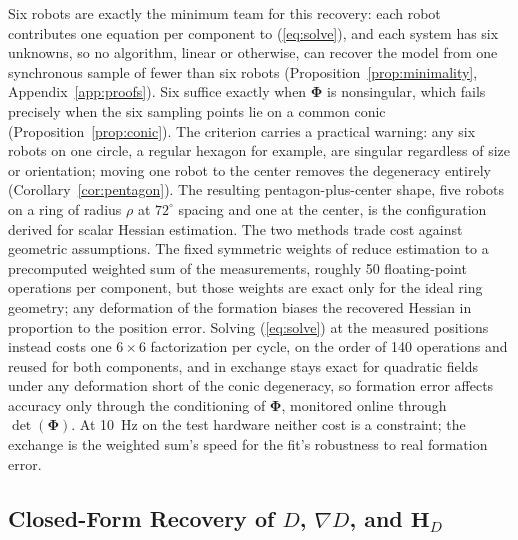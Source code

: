 \documentclass[lettersize,journal]{IEEEtran}
\begin{document}
Six robots are exactly the minimum team for this recovery: each robot
contributes one equation per component to (\ref{eq:solve}), and each
system has six unknowns, so no algorithm, linear or otherwise, can
recover the model from one synchronous sample of fewer than six robots
(Proposition~\ref{prop:minimality}, Appendix~\ref{app:proofs}). Six
suffice exactly when $\boldsymbol{\Phi}$ is nonsingular, which fails
precisely when the six sampling points lie on a common conic
(Proposition~\ref{prop:conic}). The criterion carries a practical
warning: any six robots on one circle, a regular hexagon for example,
are singular regardless of size or orientation; moving one robot to the
center removes the degeneracy entirely (Corollary~\ref{cor:pentagon}).
The resulting pentagon-plus-center shape, five robots on a ring of
radius $\rho$ at $72^\circ$ spacing and one at the center, is the
configuration \cite{15} derived for scalar Hessian estimation. The two
methods trade cost against geometric assumptions. The fixed symmetric
weights of \cite{15} reduce estimation to a precomputed weighted sum of
the measurements, roughly 50 floating-point operations per component,
but those weights are exact only for the ideal ring geometry; any
deformation of the formation biases the recovered Hessian in proportion
to the position error. Solving (\ref{eq:solve}) at the measured
positions instead costs one $6 \times 6$ factorization per cycle, on the
order of 140 operations and reused for both components, and in exchange
stays exact for quadratic fields under any deformation short of the
conic degeneracy, so formation error affects accuracy only through the
conditioning of $\boldsymbol{\Phi}$, monitored online through
$\det(\boldsymbol{\Phi})$. At 10~Hz on the test hardware neither cost is
a constraint; the exchange is the weighted sum's speed for the fit's
robustness to real formation error.

\subsection{Closed-Form Recovery of $D$, $\nabla D$, and $\mathbf{H}_D$}
\end{document}
